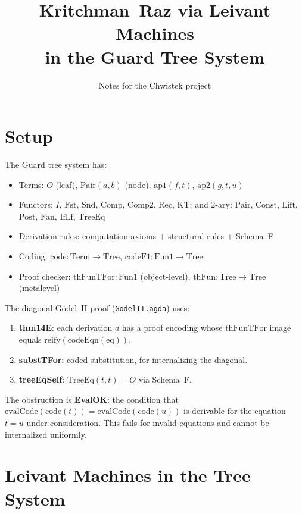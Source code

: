 \documentclass[11pt]{article}
\title{Kritchman--Raz via Leivant Machines\\in the Guard Tree System}
\author{Notes for the Chwistek project}
\date{}
\begin{document}
\maketitle

\section{Setup}

The Guard tree system has:
\begin{itemize}
\item Terms: $O$ (leaf), $\mathrm{Pair}(a,b)$ (node), $\mathrm{ap1}(f,t)$, $\mathrm{ap2}(g,t,u)$
\item Functors: $I$, $\mathrm{Fst}$, $\mathrm{Snd}$, $\mathrm{Comp}$, $\mathrm{Comp2}$, $\mathrm{Rec}$, $\mathrm{KT}$; and 2-ary: $\mathrm{Pair}$, $\mathrm{Const}$, $\mathrm{Lift}$, $\mathrm{Post}$, $\mathrm{Fan}$, $\mathrm{IfLf}$, $\mathrm{TreeEq}$
\item Derivation rules: computation axioms + structural rules + Schema~F
\item Coding: $\mathrm{code} : \mathrm{Term} \to \mathrm{Tree}$, $\mathrm{codeF1} : \mathrm{Fun1} \to \mathrm{Tree}$
\item Proof checker: $\mathrm{thFunTFor} : \mathrm{Fun1}$ (object-level), $\mathrm{thFun} : \mathrm{Tree} \to \mathrm{Tree}$ (metalevel)
\end{itemize}

The diagonal G\"odel~II proof (\texttt{GodelII.agda}) uses:
\begin{enumerate}
\item \textbf{thm14E}: each derivation $d$ has a proof encoding whose $\mathrm{thFunTFor}$ image equals $\mathrm{reify}(\mathrm{codeEqn}(\mathrm{eq}))$.
\item \textbf{substTFor}: coded substitution, for internalizing the diagonal.
\item \textbf{treeEqSelf}: $\mathrm{TreeEq}(t,t) = O$ via Schema~F.
\end{enumerate}

The obstruction is \textbf{EvalOK}: the condition that $\mathrm{evalCode}(\mathrm{code}(t)) = \mathrm{evalCode}(\mathrm{code}(u))$ is derivable for the equation $t = u$ under consideration. This fails for invalid equations and cannot be internalized uniformly.

\section{Leivant Machines in the Tree System}
\end{document}
